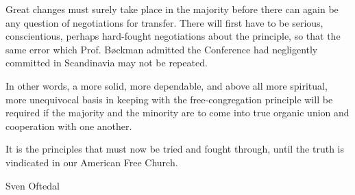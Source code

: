 Great changes must surely take place in the majority before there can again be any question of negotiations for transfer. There will first have to be serious, conscientious, perhaps hard-fought negotiations about the principle, so that the same error which Prof. Bøckman admitted the Conference had negligently committed in Scandinavia may not be repeated.

In other words, a more solid, more dependable, and above all more spiritual, more unequivocal basis in keeping with the free-congregation principle will be required if the majority and the minority are to come into true organic union and cooperation with one another.

It is the principles that must now be tried and fought through, until the truth is vindicated in our American Free Church.

Sven Oftedal
